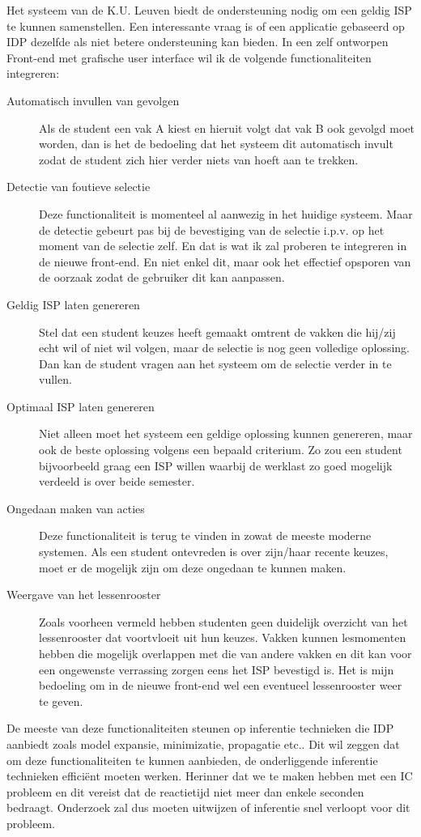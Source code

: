 Het systeem van de K.U. Leuven biedt de ondersteuning nodig om een geldig ISP te kunnen samenstellen. Een interessante vraag is of een applicatie gebaseerd op IDP dezelfde als niet betere ondersteuning kan bieden. In een zelf ontworpen Front-end met grafische user interface wil ik de volgende functionaliteiten integreren:
\begin{description}
\item[Automatisch invullen van gevolgen] Als de student een vak A kiest en hieruit volgt dat vak B ook gevolgd moet worden, dan is het de bedoeling dat het systeem dit automatisch invult zodat de student zich hier verder niets van hoeft aan te trekken. 
\item[Detectie van foutieve selectie] Deze functionaliteit is momenteel al aanwezig in het huidige systeem. Maar de detectie gebeurt pas bij de bevestiging van de selectie i.p.v. op het moment van de selectie zelf. En dat is wat ik zal proberen te integreren in de nieuwe front-end. En niet enkel dit, maar ook het effectief opsporen van de oorzaak zodat de gebruiker dit kan aanpassen.
\item[Geldig ISP laten genereren] Stel dat een student keuzes heeft gemaakt omtrent de vakken die hij/zij echt wil of niet wil volgen, maar de selectie is nog geen volledige oplossing. Dan kan de student vragen aan het systeem om de selectie verder in te vullen.
\item[Optimaal ISP laten genereren] Niet alleen moet het systeem een geldige oplossing kunnen genereren, maar ook de beste oplossing volgens een bepaald criterium. Zo zou een student bijvoorbeeld graag een ISP willen waarbij de werklast zo goed mogelijk verdeeld is over beide semester. 
\item[Ongedaan maken van acties] Deze functionaliteit is terug te vinden in zowat de meeste moderne systemen. Als een student ontevreden is over zijn/haar recente keuzes, moet er de mogelijk zijn om deze ongedaan te kunnen maken. 
\item[Weergave van het lessenrooster] Zoals voorheen vermeld hebben studenten geen duidelijk overzicht van het lessenrooster dat voortvloeit uit hun keuzes. Vakken kunnen lesmomenten hebben die mogelijk overlappen met die van andere vakken en dit kan voor een ongewenste verrassing zorgen eens het ISP bevestigd is. Het is mijn bedoeling om in de nieuwe front-end wel een eventueel lessenrooster weer te geven.
\end{description}
De meeste van deze functionaliteiten steunen op inferentie technieken die IDP aanbiedt zoals model expansie, minimizatie, propagatie etc.. Dit wil zeggen dat om deze functionaliteiten te kunnen aanbieden, de onderliggende inferentie technieken effici\"{e}nt moeten werken. Herinner dat we te maken hebben met een IC probleem en dit vereist dat de reactietijd niet meer dan enkele seconden bedraagt. Onderzoek zal dus moeten uitwijzen of inferentie snel verloopt voor dit probleem.

